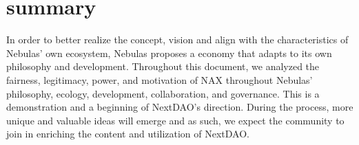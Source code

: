 \section{summary}
In order to better realize the concept, vision and align with the characteristics of Nebulas' own ecosystem, Nebulas proposes a economy that adapts to its own philosophy and development. Throughout this document, we analyzed the fairness, legitimacy, power, and motivation of NAX throughout Nebulas' philosophy, ecology, development, collaboration, and governance. This is a demonstration and a beginning of NextDAO's direction. During the process, more unique and valuable ideas will emerge and as such, we expect the community to join in enriching the content and utilization of NextDAO.

